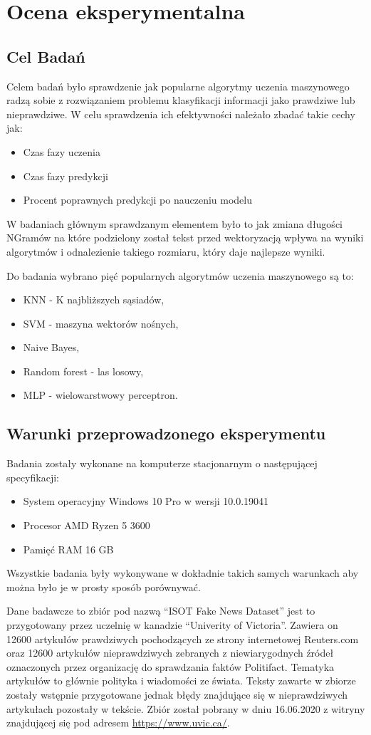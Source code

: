 \chapter{Ocena eksperymentalna}
\section{Cel Badań}
Celem badań było sprawdzenie jak popularne algorytmy uczenia maszynowego radzą sobie z rozwiązaniem problemu 
klasyfikacji informacji jako prawdziwe lub nieprawdziwe. W celu sprawdzenia ich efektywności należało zbadać
takie cechy jak:
\begin{itemize}
    \item Czas fazy uczenia
    \item Czas fazy predykcji
    \item Procent poprawnych predykcji po nauczeniu modelu
\end{itemize}
W badaniach głównym sprawdzanym elementem było to jak zmiana długości NGramów na które podzielony
został tekst przed wektoryzacją wpływa na wyniki algorytmów i odnalezienie takiego rozmiaru, który
daje najlepsze wyniki. 

Do badania wybrano pięć popularnych algorytmów uczenia maszynowego są to: 
\begin{itemize}
    \item KNN - K najbliższych sąsiadów,
    \item SVM - maszyna wektorów nośnych,
    \item Naive Bayes,
    \item Random forest - las losowy,
    \item MLP - wielowarstwowy perceptron.
\end{itemize} 
\section{Warunki przeprowadzonego eksperymentu}
Badania zostały wykonane na komputerze stacjonarnym o następującej specyfikacji:
\begin{itemize}
    \item System operacyjny Windows 10 Pro w wersji 10.0.19041
    \item Procesor AMD Ryzen 5 3600
    \item Pamięć RAM 16 GB
\end{itemize}
Wszystkie badania były wykonywane w dokładnie takich samych warunkach aby można było 
je w prosty sposób porównywać. 

Dane badawcze to zbiór pod nazwą ``ISOT Fake News Dataset'' jest to przygotowany przez uczelnię w 
kanadzie ``Univerity of Victoria''. Zawiera on 12600 artykułów prawdziwych pochodzących ze strony
internetowej Reuters.com oraz 12600 artykułów nieprawdziwych zebranych z niewiarygodnych źródeł
oznaczonych przez organizację do sprawdzania faktów Politifact. Tematyka artykułów to głównie polityka i wiadomości 
ze świata.  Teksty zawarte w zbiorze zostały wstępnie przygotowane jednak błędy znajdujące się w nieprawdziwych 
artykułach pozostały w tekście. Zbiór został pobrany w dniu 16.06.2020 z witryny znajdującej się pod adresem \url{https://www.uvic.ca/}.~\cite{ISOT}

